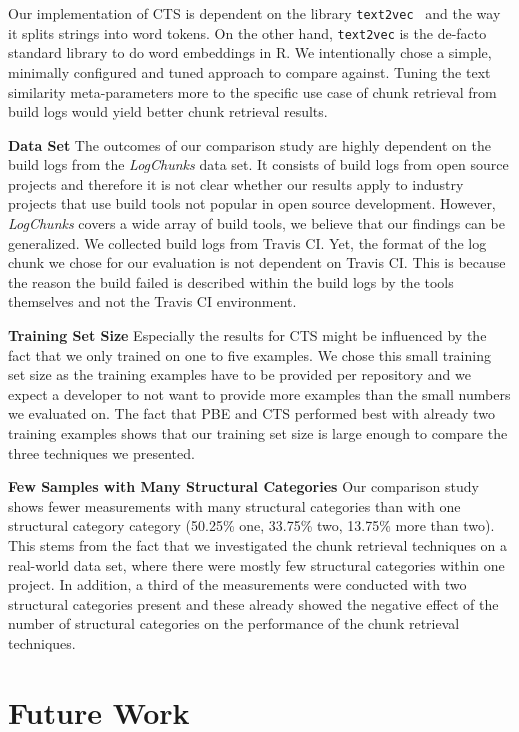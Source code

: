 Our implementation of CTS is dependent on the library
{\tt text2vec}~\cite{text2vec2019webpage}
and the way it splits strings into word tokens.
On the other hand,
{\tt text2vec} is the de-facto standard library to do word embeddings
in R.
We intentionally chose a simple, minimally configured and tuned
approach to compare against.
Tuning the text similarity
meta-parameters more to the specific use case of chunk retrieval from
build logs would yield better chunk retrieval results.

\textbf{Data Set}
The outcomes of our comparison study are highly dependent on the build
logs from the \emph{LogChunks} data set.
It consists of build
logs from open source projects and therefore it is not clear whether
our results apply to industry projects that use build tools
not popular in open source development.
However, \emph{LogChunks} covers a wide array of build tools,
we believe that our findings can be generalized.
We collected build logs from Travis CI.
Yet, the format of the log chunk we chose
for our evaluation is not dependent on Travis CI\@.
This
is because the reason the build failed is described within the build
logs by the tools themselves and not the Travis CI environment.

\textbf{Training Set Size}
Especially the results for CTS might be influenced by the fact that we
only trained on one to five examples.
We chose this small training set
size as the training examples have to be provided per repository and
we expect a developer to not want to provide more examples than the
small numbers we evaluated on.
The fact that PBE and CTS performed best with already two training
examples shows that our training set size is large enough to
compare the three techniques we presented.

\textbf{Few Samples with Many Structural Categories}
Our comparison study shows fewer measurements with many structural
categories than with one structural category category
(50.25\% one, 33.75\% two, 13.75\% more than two).
This stems from the fact that we investigated the chunk retrieval
techniques on a real-world data set, where there were mostly few
structural categories within one project.
In addition, a third of the measurements were conducted with two
structural categories present and these already showed the negative
effect of the number of structural categories on the performance
of the chunk retrieval techniques.

\section{Future Work}

